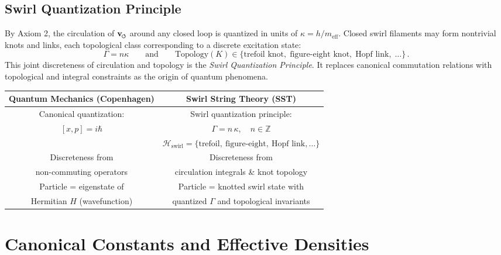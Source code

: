 \documentclass[11pt]{article}
\newcommand{\swirlarrow}{%
    \mathchoice{\mkern-2mu\scriptstyle\boldsymbol{\circlearrowleft}}%
    {\mkern-2mu\scriptstyle\boldsymbol{\circlearrowleft}}%
    {\mkern-2mu\scriptscriptstyle\boldsymbol{\circlearrowleft}}%
    {\mkern-2mu\scriptscriptstyle\boldsymbol{\circlearrowleft}}%
}
\newcommand{\vswirl}{\mathbf{v}_{\swirlarrow}}
\begin{document}
    \subsection{Swirl Quantization Principle}
        \label{sec:swirl_quantization}
        By Axiom 2, the circulation of $\vswirl$ around any closed loop is quantized in units of $\kappa=h/m_{\text{eff}}$. Closed swirl filaments may form nontrivial knots and links, each topological class corresponding to a discrete excitation state:
        \[
            \Gamma = n\kappa \qquad \text{and} \qquad \text{Topology}(K)\in \{\text{trefoil knot},\; \text{figure-eight knot},\; \text{Hopf link},\;\dots\}\,.
        \]
        This joint discreteness of circulation and topology is the \emph{Swirl Quantization Principle}. It replaces canonical commutation relations with topological and integral constraints as the origin of quantum phenomena.
        \begin{center}\setlength{\tabcolsep}{5pt}
        \begin{tabular}{|c|c|}
        \hline
        \textbf{Quantum Mechanics (Copenhagen)} & \textbf{Swirl String Theory (SST)} \\
        \hline
        Canonical quantization: & Swirl quantization principle: \\
        $[x, p] = i \hbar$ & $\displaystyle \Gamma = n\,\kappa,\quad n\in\mathbb{Z}$ \\[6pt]
        & $\displaystyle \mathcal{H}_{\text{swirl}} = \{\text{trefoil},\ \text{figure-eight},\ \text{Hopf link},\dots\}$ \\
        \hline
        Discreteness from & Discreteness from \\
        non-commuting operators & circulation integrals \& knot topology \\
        \hline
        Particle = eigenstate of & Particle = knotted swirl state with \\
        Hermitian $H$ (wavefunction) & quantized $\Gamma$ and topological invariants \\
        \hline
        \end{tabular}
        \end{center}

\section{Canonical Constants and Effective Densities}
    \label{sec:canonical_constants}
\end{document}
